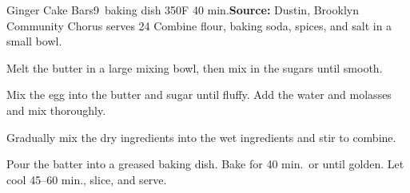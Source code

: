 \begin{recipe}{Ginger Cake Bars}{9\inch{}\inch\ baking dish \hfill 350\0F \hfill 40 min.}{\textbf{Source:} Dustin, Brooklyn Community Chorus \hfill serves 24}
 Combine flour, baking soda, spices, and salt in a small bowl.

 Melt the butter in a large mixing bowl, then mix in the sugars until smooth.

 Mix the egg into the butter and sugar until fluffy. Add the water and molasses and mix thoroughly.

 \newstep Gradually mix the dry ingredients into the wet ingredients and stir to combine.

 \newstep Pour the batter into a greased baking dish. Bake for 40 min.\ or until golden. Let cool 45--60 min., slice, and serve.
\end{recipe}

